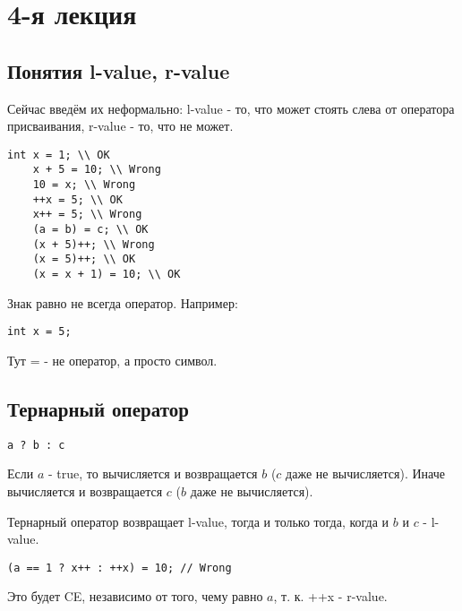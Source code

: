 \section{4-я лекция}

\subsection{Понятия l-value, r-value}
Сейчас введём их неформально: l-value - то, что может стоять слева от оператора присваивания, r-value - то, что не может.

\begin{Verbatim}[tabsize=4]
	int x = 1; \\ OK
	x + 5 = 10; \\ Wrong
	10 = x; \\ Wrong
	++x = 5; \\ OK
	x++ = 5; \\ Wrong
	(a = b) = c; \\ OK
	(x + 5)++; \\ Wrong
	(x = 5)++; \\ OK
	(x = x + 1) = 10; \\ OK
\end{Verbatim}

\begin{note}
	Знак равно не всегда оператор. Например:
	\begin{Verbatim}[tabsize=4]
		int x = 5;
	\end{Verbatim}
	
	Тут = - не оператор, а просто символ.
\end{note}


\subsection{Тернарный оператор}
\begin{Verbatim}[tabsize=4]
	a ? b : c
\end{Verbatim}

Если $a$ - true, то вычисляется и возвращается $b$ ($c$ даже не вычисляется). Иначе вычисляется и возвращается $c$ ($b$ даже не вычисляется).

Тернарный оператор возвращает l-value, тогда и только тогда, когда и $b$ и $c$ - l-value.

\begin{Verbatim}[tabsize=4]
	(a == 1 ? x++ : ++x) = 10; // Wrong
\end{Verbatim}

Это будет CE, независимо от того, чему равно $a$, т. к. ++x - r-value.


